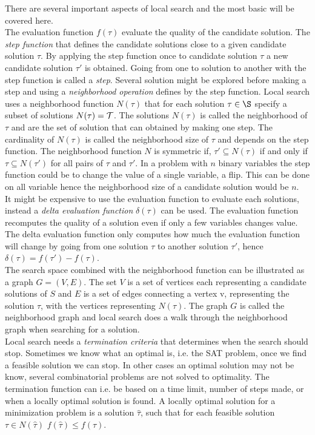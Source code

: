 There are several important aspects of local search and the most basic will be covered here. \\The evaluation function 
$f(\tau)$ evaluate the quality of the candidate solution. 
The \emph{step function} that defines the candidate solutions close to a given candidate solution $\tau$. By applying 
the step function once to candidate solution $\tau$ a new candidate solution $\tau'$ is obtained. Going from one to 
solution to another with the step function is called a \emph{step}. Several solution might be explored before making a 
step and using a \emph{neighborhood operation} defines by the step function.  Local search uses a neighborhood function 
$N(\tau)$ that for each solution $\tau \in \S$ specify a subset of solutions $N(\tau) = \mathcal{T}$. The solutions $N(\tau)$ 
is called the neighborhood of $\tau$ and are the set of solution that can obtained by making one step. The cardinality 
of $N(\tau)$ is called the neighborhood size of $\tau$ and depends on the step function. The neighborhood function $N$ 
is symmetric if, $\tau' \subseteq N(\tau)$ if and only if $\tau \subseteq N(\tau')$ for all pairs of $\tau$ and $\tau'$. 
In a problem with $n$ binary variables the step function could be to change the value of a single variable, a flip.  
This can be done on all variable hence the neighborhood size of a candidate solution would be $n$. \\ 
It might be expensive to use the evaluation function to evaluate each solutions, instead a \emph{delta evaluation 
function} $\delta(\tau)$ can be used. The evaluation function recomputes the quality of a solution even if only a few 
variables changes value. The delta evaluation function only computes how much the evaluation function will change by 
going from one solution $\tau$ to another solution $\tau'$, hence $\delta(\tau) = f(\tau')-f(\tau)$. \\
The search space combined with the neighborhood function can be illustrated as a graph $G = (V,E)$. The set $V$ is a 
set of vertices each representing a candidate solutions of $S$ and $E$ is a set of edges connecting a vertex v, 
representing the solution $\tau$, with the vertices representing $N(\tau)$. The graph $G$ is called the neighborhood 
graph and local search does a walk through the neighborhood graph when searching for a solution. \cite[p. 3-5]{lsbog} 
\\ 
Local search needs a \emph{termination criteria} that determines when the search should stop. Sometimes we know what 
an optimal is, i.e. the SAT problem, once we find a feasible solution we can stop. In other cases an optimal solution 
may not be know, several combinatorial problems are not solved to optimality. The termination function can i.e. be based 
on a time limit, number of steps made, or when a locally optimal solution is found. A locally optimal solution for 
a minimization problem is a solution $\hat{\tau}$, such that for each feasible solution $\tau \in N(\hat{\tau})$ 
$f(\hat{\tau}) \leq f(\tau)$. \\

